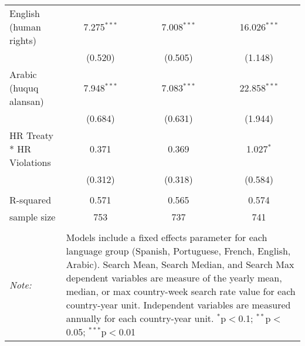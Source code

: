 \begin{table}[!htbp]
\begin{tabular}{@{\extracolsep{5pt}}lccc}
  English (human rights) & 7.275$^{***}$ & 7.008$^{***}$ & 16.026$^{***}$ \\ 
  & (0.520) & (0.505) & (1.148) \\ 
  Arabic (huquq alansan) & 7.948$^{***}$ & 7.083$^{***}$ & 22.858$^{***}$ \\ 
  & (0.684) & (0.631) & (1.944) \\ 
  HR Treaty * HR Violations & 0.371 & 0.369 & 1.027$^{*}$ \\ 
  & (0.312) & (0.318) & (0.584) \\ 
 \hline \\[-1.8ex] 
R-squared  & 0.571 & 0.565 & 0.574 \\ 
sample size  & 753 & 737 & 741 \\ 
\hline 
\hline \\[-1.8ex] 
\textit{Note:}  & \multicolumn{3}{l}{\parbox[t]{8cm}{Models include a fixed effects parameter for each language group (Spanish, Portuguese, French, English, Arabic). Search Mean, Search Median, and Search Max dependent variables are measure of the yearly mean, median, or max country-week search rate value for each country-year unit. Independent variables are measured annually for each country-year unit. $^{*}$p$<$0.1; $^{**}$p$<$0.05; $^{***}$p$<$0.01}} \\ 
\end{tabular} 
\end{table} 
